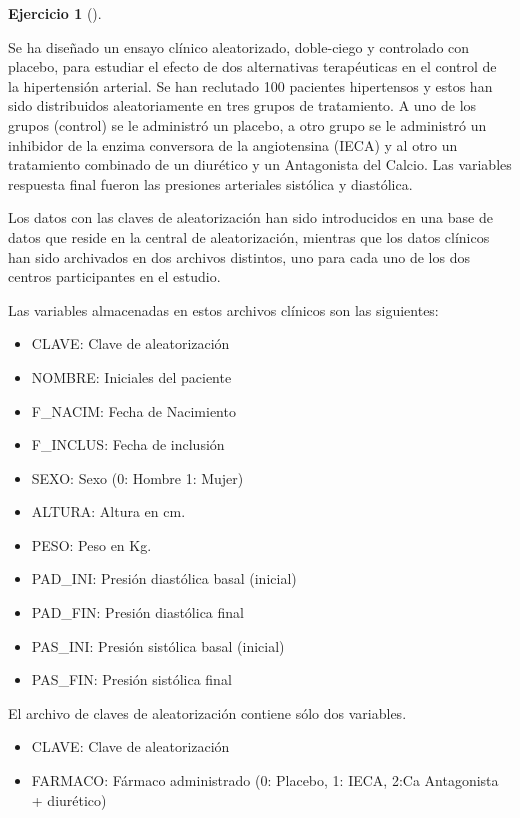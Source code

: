 \documentclass[
  a4paper,
]{scrreport}
\providecommand{\tightlist}{%
  \setlength{\itemsep}{0pt}\setlength{\parskip}{0pt}}\usepackage{longtable,booktabs,array}
\theoremstyle{definition}
\newtheorem{exercise}{Ejercicio}[chapter]
\theoremstyle{remark}
\begin{document}
\begin{exercise}[]\protect\hypertarget{exr-preprocesamiento-4}{}\label{exr-preprocesamiento-4}

Se ha diseñado un ensayo clínico aleatorizado, doble-ciego y controlado
con placebo, para estudiar el efecto de dos alternativas terapéuticas en
el control de la hipertensión arterial. Se han reclutado 100 pacientes
hipertensos y estos han sido distribuidos aleatoriamente en tres grupos
de tratamiento. A uno de los grupos (control) se le administró un
placebo, a otro grupo se le administró un inhibidor de la enzima
conversora de la angiotensina (IECA) y al otro un tratamiento combinado
de un diurético y un Antagonista del Calcio. Las variables respuesta
final fueron las presiones arteriales sistólica y diastólica.

Los datos con las claves de aleatorización han sido introducidos en una
base de datos que reside en la central de aleatorización, mientras que
los datos clínicos han sido archivados en dos archivos distintos, uno
para cada uno de los dos centros participantes en el estudio.

Las variables almacenadas en estos archivos clínicos son las siguientes:

\begin{itemize}
\tightlist
\item
  CLAVE: Clave de aleatorización
\item
  NOMBRE: Iniciales del paciente
\item
  F\_NACIM: Fecha de Nacimiento
\item
  F\_INCLUS: Fecha de inclusión
\item
  SEXO: Sexo (0: Hombre 1: Mujer)
\item
  ALTURA: Altura en cm.
\item
  PESO: Peso en Kg.
\item
  PAD\_INI: Presión diastólica basal (inicial)
\item
  PAD\_FIN: Presión diastólica final
\item
  PAS\_INI: Presión sistólica basal (inicial)
\item
  PAS\_FIN: Presión sistólica final
\end{itemize}

El archivo de claves de aleatorización contiene sólo dos variables.

\begin{itemize}
\tightlist
\item
  CLAVE: Clave de aleatorización
\item
  FARMACO: Fármaco administrado (0: Placebo, 1: IECA, 2:Ca Antagonista +
  diurético)
\end{itemize}


\end{exercise}
\end{document}
